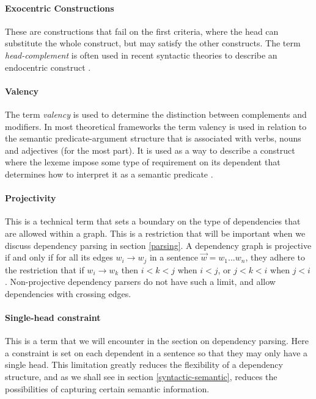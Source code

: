 \paragraph{Exocentric Constructions} These are constructions that fail on the first criteria, where the head can substitute the whole construct, but may satisfy the other constructs. The term \textit{head-complement} is often used in recent syntactic theories to describe an endocentric construct \cite{Niv:05}.

\paragraph{Valency} The term \textit{valency} is used to determine the distinction between complements and modifiers. In most theoretical frameworks the term valency is used in relation to the semantic predicate-argument structure that is associated with verbs, nouns and adjectives (for the most part). It is used as a way to describe a construct where the lexeme impose some type of requirement on its dependent that determines how to interpret it as a semantic predicate \cite{Niv:05}.

\paragraph{Projectivity} This is a technical term that sets a boundary on the type of dependencies that are allowed within a graph. This is a restriction that will be important when we discuss dependency parsing in section \ref{parsing}. A dependency graph is projective if and only if for all its edges $w_i \rightarrow w_j$ in a sentence $\vec{w} = w_1 ... w_n$, they adhere to the restriction that if $w_i \rightarrow w_k$ then $i < k < j$ when $i < j$, or $j < k < i$ when $j < i$ \cite{KublerEtAl:09}. Non-projective dependency parsers do not have such a limit, and allow dependencies with crossing edges. 

\paragraph{Single-head constraint} This is a term that we will encounter in the section on dependency parsing. Here a constraint is set on each dependent in a sentence so that they may only have a single head. This limitation greatly reduces the flexibility of a dependency structure, and as we shall see in section \ref{syntactic-semantic}, reduces the possibilities of capturing certain semantic information.\\

